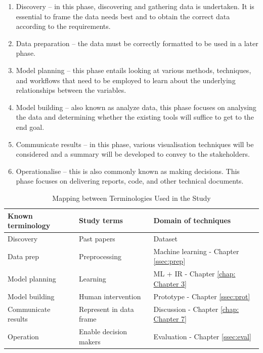 \begin{enumerate}
    \item Discovery – in this phase, discovering and gathering data is undertaken. It is essential to frame the data needs best and to obtain the correct data according to the requirements.
    \item Data preparation – the data must be correctly formatted to be used in a later phase.
    \item Model planning – this phase entails looking at various methods, techniques, and workflows that need to be employed to learn about the underlying relationships between the variables.
    \item Model building – also known as analyze data, this phase focuses on analysing the data and determining whether the existing tools will suffice to get to the end goal.
    \item Communicate results – in this phase, various visualisation techniques will be considered and a summary will be developed to convey to the stakeholders.
    \item Operationalise – this is also commonly known as making decisions. This phase focuses on delivering reports, code, and other technical documents.
\end{enumerate}

\begin{table}[htbp]
\centering
\begin{tabular}{|l|l|l|}
\hline
\textbf{Known terminology} & \textbf{Study terms} & \textbf{Domain of techniques} \\ \hline
Discovery & Past papers & Dataset\\ \hline
Data prep & Preprocessing & Machine learning - Chapter \ref{ssec:prep}\\ \hline
Model planning & Learning & ML + IR - Chapter \ref{chap: Chapter 3} \\ \hline
Model building & Human intervention & Prototype - Chapter \ref{ssec:prot} \\ \hline
Communicate results & Represent in data frame & Discussion - Chapter \ref{chap: Chapter 7}\\ \hline
Operation & Enable decision makers & Evaluation - Chapter \ref{ssec:eval} \\ \hline
\end{tabular}
\caption{Mapping between Terminologies Used in the Study}
\label{tab:mapping}
\end{table}

